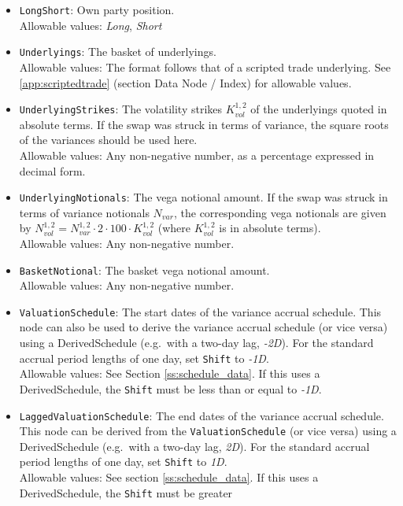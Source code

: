 \begin{itemize}
  \item \lstinline!LongShort!: Own party position. \\
    Allowable values: \emph{Long}, \emph{Short}
  \item \lstinline!Underlyings!: The basket of underlyings. \\
    Allowable values: The format follows that of a scripted trade underlying. See \ref{app:scriptedtrade}
    (section Data Node / Index) for allowable values.
  \item \lstinline!UnderlyingStrikes!: The volatility strikes $K^{1,2}_{vol}$ of the underlyings quoted in absolute terms.
  If the swap was struck in terms of variance, the square roots of the variances should be used here. \\
    Allowable values: Any non-negative number, as a percentage expressed in decimal form.
  \item \lstinline!UnderlyingNotionals!: The vega notional amount. If the swap was struck in terms of variance notionals
  $N_{var}$, the corresponding vega notionals are given by $N^{1,2}_{vol} = N^{1,2}_{var} \cdot 2 \cdot 100 \cdot K^{1,2}_{vol}$
  (where $K^{1,2}_{vol}$ is in absolute terms). \\
    Allowable values: Any non-negative number. 
  \item{} \lstinline!BasketNotional!: The basket vega notional amount. \\
    Allowable values: Any non-negative number.
  \item{} \lstinline!ValuationSchedule!: The start dates of the variance accrual schedule. This node can
  also be used to derive the variance accrual schedule (or vice versa) using a DerivedSchedule (e.g.\ with a two-day lag, \emph{-2D}).
  For the standard accrual period lengths of one day, set \lstinline!Shift! to \emph{-1D}. \\
    Allowable values: See Section \ref{ss:schedule_data}. If this uses a DerivedSchedule, the \lstinline!Shift! must be less
  than or equal to \emph{-1D}.
  \item{} \lstinline!LaggedValuationSchedule!: The end dates of the variance accrual schedule. This node can be derived from
  the \lstinline!ValuationSchedule! (or vice versa) using a DerivedSchedule (e.g.\ with a two-day lag, \emph{2D}). For the standard
  accrual period lengths of one day, set \lstinline!Shift! to \emph{1D}. \\
    Allowable values: See section \ref{ss:schedule_data}. If this uses a DerivedSchedule, the \lstinline!Shift! must be greater

\end{itemize}
